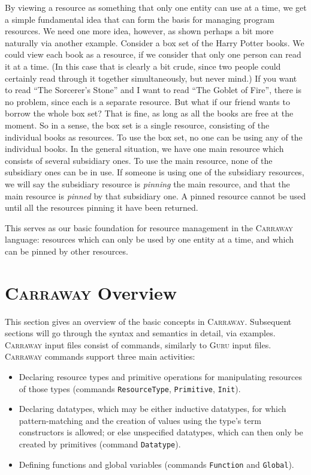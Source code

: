 \documentclass{book}[12pt]
\newcommand{\guru}[0]{\textsc{Guru}\xspace}
\newcommand{\carraway}[0]{\textsc{Carraway}\xspace}
\begin{document}
By viewing a resource as something that only one entity can use at a
time, we get a simple fundamental idea that can form the basis for
managing program resources.  We need one more idea, however, as shown
perhaps a bit more naturally via another example.  Consider a box set
of the Harry Potter books.  We could view each book as a resource, if
we consider that only one person can read it at a time.  (In this case
that is clearly a bit crude, since two people could certainly read
through it together simultaneously, but never mind.)  If you want to
read ``The Sorcerer's Stone'' and I want to read ``The Goblet of
Fire'', there is no problem, since each is a separate resource.  But
what if our friend wants to borrow the whole box set?  That is fine,
as long as all the books are free at the moment.  So in a sense, the
box set is a single resource, consisting of the individual books as
resources.  To use the box set, no one can be using any of the
individual books.  In the general situation, we have one main resource
which consists of several subsidiary ones.  To use the main resource,
none of the subsidiary ones can be in use.  If someone is using one of
the subsidiary resources, we will say the subsidiary resource is
\emph{pinning} the main resource, and that the main resource is
\emph{pinned} by that subsidiary one.  A pinned resource cannot be
used until all the resources pinning it have been returned.

This serves as our basic foundation for resource management in the
\carraway language: resources which can only be used by one entity at
a time, and which can be pinned by other resources.

\section{\carraway Overview}
\label{ch9:overview}

This section gives an overview of the basic concepts in \carraway.
Subsequent sections will go through the syntax and semantics in
detail, via examples.  \carraway input files consist of commands,
similarly to \guru input files.  \carraway commands support three main
activities:

\begin{itemize}
\item Declaring resource types and primitive operations for
manipulating resources of those types (commands \texttt{ResourceType},
\texttt{Primitive}, \texttt{Init}).
\item Declaring datatypes, which may be either inductive datatypes,
for which pattern-matching and the creation of values using the type's
term constructors is allowed; or else unspecified datatypes, which can
then only be created by primitives (command \texttt{Datatype}).
\item Defining functions and global variables (commands \texttt{Function} and \texttt{Global}).
\end{itemize}
\end{document}
